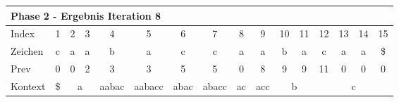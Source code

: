 \begin{table}[H]
\caption[Konstruktion des Suffix Arrays f{\"u}r das Wort caabaccaabacaa: Phase 2, Iteration 7]{Konstruktion des Suffix Arrays f{\"u}r das Wort caabaccaabacaa: Phase 2, Iteration 7. Betrachteter Index: 7, enthaltener Wert: 3, Vorg{\"a}ngerelement: 2, \prevpointer-Kette: 0. Keine neuen Elemente werden in SA aufgenommen.}
\label{table_complex_example_2_7} 
\end{table}

\begin{table}[H]
\centering
\begin{adjustbox}{max width=\textwidth}
\centering
\begin{tabular}{lccccccccccccccc}
\multicolumn{16}{l}{Phase 2 - Ergebnis Iteration 8}                                                                                                                                                                                                                                                                                                                   \\ \hline
\multicolumn{1}{l|}{Index}   & 1                       & 2  & 3                       & 4                          & 5                           & 6                         & 7                          & 8                                               & 9                        & 10                         & 11                      & 12  & 13  & 14  & 15  \\
\multicolumn{1}{l|}{Zeichen} & c                       & a  & a                       & b                          & a                           & c                         & c                          & a                                               & a                        & b                          & a                       & c   & a   & a   & \$  \\
\multicolumn{1}{l|}{Prev}    & 0                       & 0  & 2                       & 3                          & 3                           & 5                         & 5                          & 0                                               & 8                        & 9                          & 9                       & 11  & 0   & 0   & 0   \\ \hline
\multicolumn{1}{l|}{Kontext} & \multicolumn{1}{c|}{\$} & \multicolumn{2}{c|}{a}       & \multicolumn{1}{c|}{aabac} & \multicolumn{1}{c|}{aabacc} & \multicolumn{1}{c|}{abac} & \multicolumn{1}{c|}{abacc} & \multicolumn{1}{c|}{ac}                         & \multicolumn{1}{c|}{acc} & \multicolumn{2}{c|}{b}                               & \multicolumn{4}{c}{c} \\

\end{tabular}
\end{adjustbox}
\end{table}

